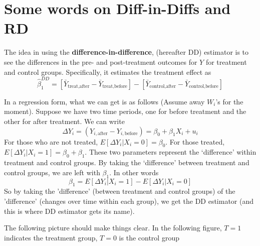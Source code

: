 \section{Some words on Diff-in-Diffs and RD}
The idea in using the \textbf{difference-in-difference}, (hereafter DD) estimator is to see the differences in the pre- and post-treatment outcomes for $Y$ for treatment and control groups. Specifically, it estimates the treatment effect as
\[
\hat{\beta}_1^{DD}=[\bar{Y}_{\text{treat,after}}-\bar{Y}_{\text{treat,before}}]-[\bar{Y}_{\text{control,after}}-\bar{Y}_{\text{control,before}}]
\]\par\medskip
In a regression form, what we can get is as follows (Assume away $W_i$'s for the moment). Suppose we have two time periods, one for before treatment and the other for after treatment. We can write
\[
\Delta Y_i=(Y_{i,\text{after}}-Y_{i,\text{before}}) = \beta_0+\beta_1X_i+u_i
\]
For those who are not treated, $E[\Delta Y_i|X_i=0]=\beta_0$. For those treated, $E[\Delta Y_i|X_i=1]=\beta_0+\beta_1$. These two parameters represent the `difference' within treatment and control groups. By taking the `difference' between treatment and control groups, we are left with $\beta_1$. In other words
\[
\beta_1 = E[\Delta Y_i|X_i=1]-E[\Delta Y_i|X_i=0]
\]
So by taking the 'difference' (between treatment and control groups) of the 'difference' (changes over time within each group), we get the DD estimator (and this is where DD estimator gets its name). \par\medskip
The following picture should make things clear. In the following figure, $T=1$ indicates the treatment group, $T=0$ is the control group

